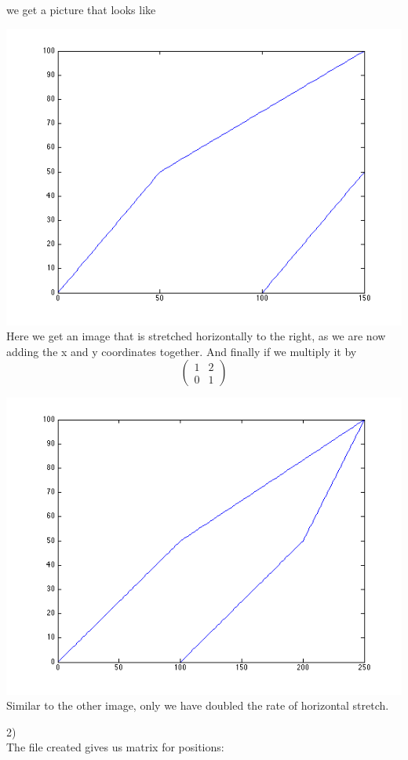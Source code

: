 \documentclass[a4paper,12pt]{article}
\begin{document}
we get a picture that looks like

\includegraphics[scale=.5]{house1.png}
Here we get an image that is stretched horizontally to the right, as we are now adding the x and y coordinates together.  And finally if we multiply it by 
\[ \left (\begin{array}{cc}
1 & 2 \\
0 & 1 \end{array} \right) \]

\includegraphics[scale = .5]{house2.png}
Similar to the other image, only we have doubled the rate of horizontal stretch.

2)\\
The file created gives us matrix for positions:
\end{document}
